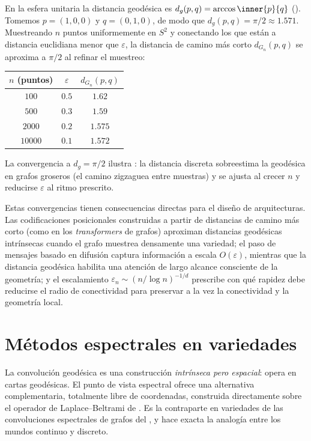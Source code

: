 \begin{example}
\label{ex:geo:sphere-numerical}
En la esfera unitaria la distancia geod\'esica es
$d_g(p,q) = \arccos\inner{p}{q}$ (). Tomemos
$p = (1,0,0)$ y $q = (0,1,0)$, de modo que $d_g(p,q) = \pi/2 \approx 1.571$.
Muestreando $n$ puntos uniformemente en $S^2$ y conectando los que est\'an a
distancia euclidiana menor que $\varepsilon$, la distancia de camino m\'as corto
$d_{G_n}(p,q)$ se aproxima a $\pi/2$ al refinar el muestreo:
\begin{center}
\begin{tabular}{@{}ccc@{}}
\toprule
$n$ (puntos) & $\varepsilon$ & $d_{G_n}(p, q)$ \\
\midrule
$100$ & $0.5$ & $1.62$ \\
$500$ & $0.3$ & $1.59$ \\
$2000$ & $0.2$ & $1.575$ \\
$10000$ & $0.1$ & $1.572$ \\
\bottomrule
\end{tabular}
\end{center}
La convergencia a $d_g = \pi/2$ ilustra : la
distancia discreta sobreestima la geod\'esica en grafos groseros (el camino
zigzaguea entre muestras) y se ajusta al crecer $n$ y reducirse $\varepsilon$ al
ritmo prescrito.
\end{example}

Estas convergencias tienen consecuencias directas para el dise\~no de
arquitecturas. Las codificaciones posicionales construidas a partir de distancias
de camino m\'as corto (como en los \emph{transformers} de grafos) aproximan
distancias geod\'esicas intr\'insecas cuando el grafo muestrea densamente una
variedad; el paso de mensajes basado en difusi\'on captura informaci\'on a escala
$O(\varepsilon)$, mientras que la distancia geod\'esica habilita una atenci\'on de
largo alcance consciente de la geometr\'ia; y el escalamiento
$\varepsilon_n \sim (n/\log n)^{-1/d}$ prescribe con qu\'e rapidez debe reducirse
el radio de conectividad para preservar a la vez la conectividad y la geometr\'ia
local.

\section{M\'etodos espectrales en variedades}
\label{sec:geo:spectral}

La convoluci\'on geod\'esica es una construcci\'on \emph{intr\'inseca pero
espacial}: opera en cartas geod\'esicas. El punto de vista espectral ofrece una
alternativa complementaria, totalmente libre de coordenadas, construida
directamente sobre el operador de Laplace--Beltrami de
. Es la contraparte en variedades de las
convoluciones espectrales de grafos del , y hace exacta la
analog\'ia entre los mundos continuo y discreto.

